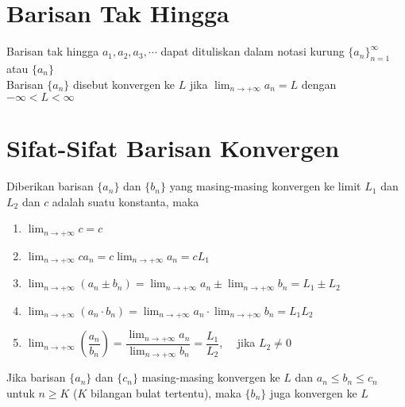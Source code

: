\documentclass{article}
\begin{document}
\section{Barisan Tak Hingga}
Barisan tak hingga $a_1,a_2,a_3,\cdots$ dapat dituliskan dalam notasi kurung $\{a_n\}_{n=1}^\infty$ atau $\{a_n\}$\\
Barisan $\{a_n\}$ disebut konvergen ke $L$ jika $\displaystyle \lim_{n\rightarrow +\infty} a_n = L$ dengan $-\infty<L<\infty$
\section{Sifat-Sifat Barisan Konvergen}
Diberikan barisan $\{a_n\}$ dan $\{b_n\}$ yang masing-masing konvergen ke limit $L_1$ dan $L_2$ dan $c$ adalah suatu konstanta, maka
\begin{enumerate}
	\item $\displaystyle \lim_{n\rightarrow +\infty} c = c$
	\item $\displaystyle \lim_{n\rightarrow +\infty} ca_n = c\lim_{n\rightarrow +\infty} a_n = cL_1$
	\item $\displaystyle \lim_{n\rightarrow +\infty} (a_n\pm b_n) = \lim_{n\rightarrow +\infty} a_n \pm \lim_{n\rightarrow +\infty} b_n = L_1\pm L_2$
	\item $\displaystyle \lim_{n\rightarrow +\infty} (a_n\cdot b_n) = \lim_{n\rightarrow +\infty} a_n \cdot \lim_{n\rightarrow +\infty} b_n = L_1L_2$
	\item $\displaystyle \lim_{n\rightarrow +\infty} \left(\dfrac{a_n}{b_n}\right) = \dfrac{\displaystyle\lim_{n\rightarrow +\infty} a_n}{\displaystyle\lim_{n\rightarrow +\infty} b_n} = \dfrac{L_1}{L_2}$, ~~jika $L_2\neq 0$
\end{enumerate}
Jika barisan $\{a_n\}$ dan $\{c_n\}$ masing-masing konvergen ke $L$ dan $a_n\leq b_n\leq c_n$ untuk $n\geq K$ ($K$ bilangan bulat tertentu), maka $\{b_n\}$ juga konvergen ke $L$
\end{document}
